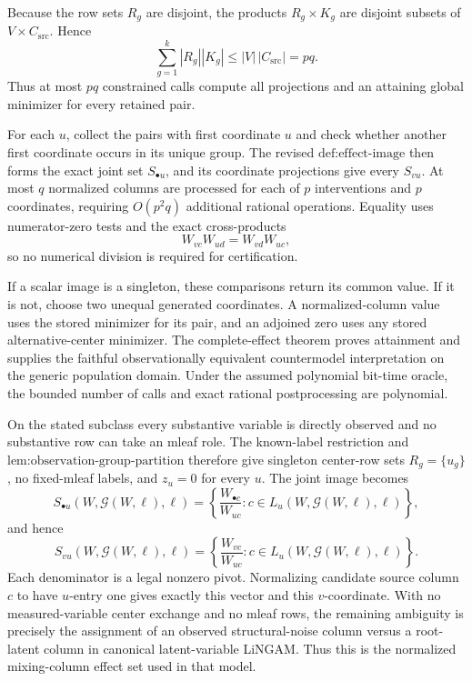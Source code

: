 Because the row sets \(R_g\) are disjoint, the products \(R_g\times K_g\) are disjoint subsets of \(V\times C_{\mathrm{src}}\).  Hence
\[
\sum_{g=1}^k|R_g||K_g|
\le |V|\,|C_{\mathrm{src}}|=pq.
\]
Thus at most \(pq\) constrained calls compute all projections and an attaining global minimizer for every retained pair.

For each \(u\), collect the pairs with first coordinate \(u\) and check whether another first coordinate occurs in its unique group.  The revised \(\text{def:effect-image}\) then forms the exact joint set \(S_{\bullet u}\), and its coordinate projections give every \(S_{vu}\).  At most \(q\) normalized columns are processed for each of \(p\) interventions and \(p\) coordinates, requiring \(O(p^2q)\) additional rational operations.  Equality uses numerator-zero tests and the exact cross-products
\[
W_{vc}W_{ud}=W_{vd}W_{uc},
\]
so no numerical division is required for certification.

If a scalar image is a singleton, these comparisons return its common value.  If it is not, choose two unequal generated coordinates.  A normalized-column value uses the stored minimizer for its pair, and an adjoined zero uses any stored alternative-center minimizer.  The complete-effect theorem proves attainment and supplies the faithful observationally equivalent countermodel interpretation on the generic population domain.  Under the assumed polynomial bit-time oracle, the bounded number of calls and exact rational postprocessing are polynomial.

On the stated subclass every substantive variable is directly observed and no substantive row can take an mleaf role.  The known-label restriction and \(\text{lem:observation-group-partition}\) therefore give singleton center-row sets \(R_g=\{u_g\}\), no fixed-mleaf labels, and \(z_u=0\) for every \(u\).  The joint image becomes
\[
S_{\bullet u}(W,\mathcal G(W,\ell),\ell)
=\left\{\frac{W_{\bullet c}}{W_{uc}}:c\in L_u(W,\mathcal G(W,\ell),\ell)\right\},
\]
and hence
\[
S_{vu}(W,\mathcal G(W,\ell),\ell)
=\left\{\frac{W_{vc}}{W_{uc}}:c\in L_u(W,\mathcal G(W,\ell),\ell)\right\}.
\]
Each denominator is a legal nonzero pivot.  Normalizing candidate source column \(c\) to have \(u\)-entry one gives exactly this vector and this \(v\)-coordinate.  With no measured-variable center exchange and no mleaf rows, the remaining ambiguity is precisely the assignment of an observed structural-noise column versus a root-latent column in canonical latent-variable LiNGAM.  Thus this is the normalized mixing-column effect set used in that model.

